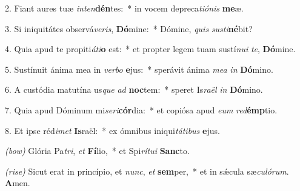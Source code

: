 2. Fiant aures tuæ \textit{in}\textit{ten}\textbf{dén}tes:~* in vocem depreca\textit{ti}\textit{ó}\textit{nis} \textbf{me}æ.

3. Si iniquitátes observá\textit{ve}\textit{ris}, \textbf{Dó}mine:~* Dómine, \textit{quis} \textit{sus}\textit{ti}\textbf{né}bit?

4. Quia apud te propiti\textit{á}\textit{ti}\textbf{o} est:~* et propter legem tuam sustí\textit{nu}\textit{i} \textit{te}, \textbf{Dó}mine.

5. Sustínuit ánima mea in \textit{ver}\textit{bo} \textbf{e}jus:~* sperávit ánima \textit{me}\textit{a} \textit{in} \textbf{Dó}mino.

6. A custódia matutína us\textit{que} \textit{ad} \textbf{noc}tem:~* speret Is\textit{ra}\textit{ël} \textit{in} \textbf{Dó}mino.

7. Quia apud Dóminum mi\textit{se}\textit{ri}\textbf{cór}dia:~* et copiósa apud \textit{e}\textit{um} \textit{red}\textbf{émp}tio.

8. Et ipse réd\textit{i}\textit{met} \textbf{Is}raël:~* ex ómnibus iniqui\textit{tá}\textit{ti}\textit{bus} \textbf{e}jus.

\textit{(bow)} Glória Pa\textit{tri}, \textit{et} \textbf{Fí}lio,~* et Spi\textit{rí}\textit{tu}\textit{i} \textbf{Sanc}to.

\textit{(rise)} Sicut erat in princípio, et \textit{nunc}, \textit{et} \textbf{sem}per,~* et in s\'{\ae}cula sæ\textit{cu}\textit{ló}\textit{rum}. \textbf{A}men.